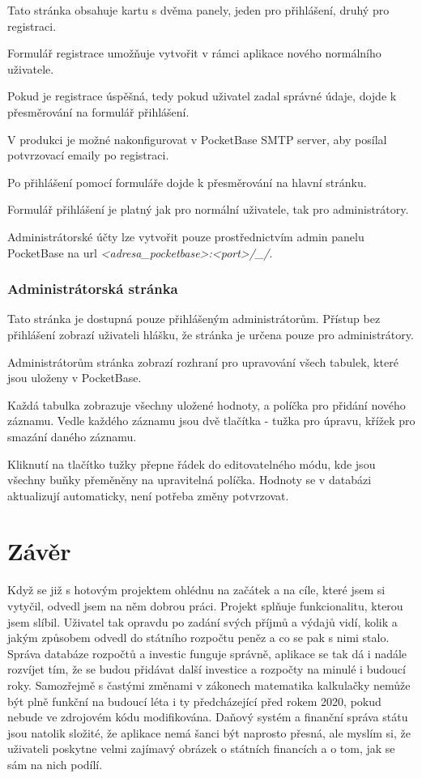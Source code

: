 \documentclass[11pt,a4paper,twoside,openright]{report}
\begin{document}
Tato stránka obsahuje kartu s dvěma panely, jeden pro přihlášení, druhý pro
registraci.

Formulář registrace umožňuje vytvořit v rámci aplikace nového normálního
uživatele.

Pokud je registrace úspěšná, tedy pokud uživatel zadal správné údaje,
dojde k přesměrování na formulář přihlášení.

V produkci je možné nakonfigurovat v PocketBase SMTP server, aby posílal potvrzovací
emaily po registraci.

Po přihlášení pomocí formuláře dojde k přesměrování na hlavní stránku.

Formulář přihlášení je platný jak pro normální uživatele, tak pro administrátory.

Administrátorské účty lze vytvořit pouze prostřednictvím admin panelu PocketBase
na url \emph{<adresa\_pocketbase>:<port>/\_/}.

\subsection{Administrátorská stránka}

Tato stránka je dostupná pouze přihlášeným administrátorům. Přístup bez přihlášení
zobrazí uživateli hlášku, že stránka je určena pouze pro administrátory.

Administrátorům stránka zobrazí rozhraní pro upravování všech tabulek, které jsou
uloženy v PocketBase.

Každá tabulka zobrazuje všechny uložené hodnoty, a políčka pro přidání nového záznamu.
Vedle každého záznamu jsou dvě tlačítka - tužka pro úpravu, křížek pro smazání daného
záznamu.

Kliknutí na tlačítko tužky přepne řádek do editovatelného módu, kde jsou všechny
buňky přeměněny na upravitelná políčka. Hodnoty se v databázi aktualizují automaticky,
není potřeba změny potvrzovat.

\chapter*{Závěr}
\pagestyle{empty}

Když se již s hotovým projektem ohlédnu na začátek a na cíle, které jsem si vytyčil, odvedl jsem na něm dobrou práci. Projekt splňuje funkcionalitu, kterou jsem slíbil. Uživatel tak opravdu po zadání svých příjmů a výdajů vidí, kolik a jakým způsobem odvedl do státního rozpočtu peněz a co se pak s nimi stalo. Správa databáze rozpočtů a investic funguje správně, aplikace se tak dá i nadále rozvíjet tím, že se budou přidávat další investice a rozpočty na minulé i budoucí roky. Samozřejmě s častými změnami v zákonech matematika kalkulačky nemůže být plně funkční na budoucí léta i ty předcházející před rokem 2020, pokud nebude ve zdrojovém kódu modifikována. Daňový systém a finanční správa státu jsou natolik složité, že aplikace nemá šanci být naprosto přesná, ale myslím si, že uživateli poskytne velmi zajímavý obrázek o státních financích a o tom, jak se sám na nich podílí.
\end{document}
